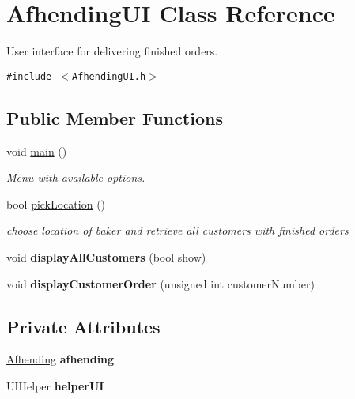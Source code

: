 \hypertarget{class_afhending_u_i}{
\section{Afhending\-UI Class Reference}
\label{class_afhending_u_i}
}
User interface for delivering finished orders.  


{\tt \#include $<$Afhending\-UI.h$>$}

\subsection*{Public Member Functions}
\begin{CompactItemize}
\item 
\hypertarget{class_afhending_u_i_ea83b916b3f52eec32ae6d54d59b4453}{
void \hyperlink{class_afhending_u_i_ea83b916b3f52eec32ae6d54d59b4453}{main} ()}
\label{class_afhending_u_i_ea83b916b3f52eec32ae6d54d59b4453}

\begin{CompactList}\small\item\em Menu with available options. \item\end{CompactList}\item 
bool \hyperlink{class_afhending_u_i_74d0d6b7d7493e8a9703bc8fbeb79f2e}{pick\-Location} ()
\begin{CompactList}\small\item\em choose location of baker and retrieve all customers with finished orders \item\end{CompactList}\item 
\hypertarget{class_afhending_u_i_388ec3e6c0999970759fa9fdcacda10e}{
void {\bf display\-All\-Customers} (bool show)}
\label{class_afhending_u_i_388ec3e6c0999970759fa9fdcacda10e}

\item 
\hypertarget{class_afhending_u_i_537283a7f7677384872f66c6b1dc4491}{
void {\bf display\-Customer\-Order} (unsigned int customer\-Number)}
\label{class_afhending_u_i_537283a7f7677384872f66c6b1dc4491}

\end{CompactItemize}
\subsection*{Private Attributes}
\begin{CompactItemize}
\item 
\hypertarget{class_afhending_u_i_6d54613ddac2c68ed16224a0ac770eb5}{
\hyperlink{class_afhending}{Afhending} {\bf afhending}}
\label{class_afhending_u_i_6d54613ddac2c68ed16224a0ac770eb5}

\item 
\hypertarget{class_afhending_u_i_165ca02db075e280199e0970e3465900}{
UIHelper {\bf helper\-UI}}
\label{class_afhending_u_i_165ca02db075e280199e0970e3465900}

\end{CompactItemize}


